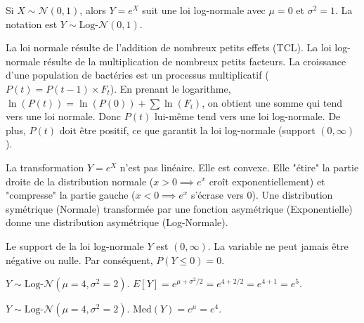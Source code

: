 \begin{correctionbox}
Si $X \sim \mathcal{N}(0, 1)$, alors $Y = e^X$ suit une loi log-normale avec $\mu=0$ et $\sigma^2=1$.
La notation est $Y \sim \text{Log-}\mathcal{N}(0, 1)$.
\end{correctionbox}

\begin{correctionbox}
La loi normale résulte de l'addition de nombreux petits effets (TCL).
La loi log-normale résulte de la multiplication de nombreux petits facteurs.
La croissance d'une population de bactéries est un processus multiplicatif ($P(t) = P(t-1) \times F_t$).
En prenant le logarithme, $\ln(P(t)) = \ln(P(0)) + \sum \ln(F_i)$, on obtient une somme qui tend vers une loi normale. Donc $P(t)$ lui-même tend vers une loi log-normale.
De plus, $P(t)$ doit être positif, ce que garantit la loi log-normale (support $(0, \infty)$).
\end{correctionbox}

\begin{correctionbox}
La transformation $Y = e^X$ n'est pas linéaire. Elle est convexe.
Elle "étire" la partie droite de la distribution normale ($x>0 \implies e^x$ croît exponentiellement) et "compresse" la partie gauche ($x<0 \implies e^x$ s'écrase vers 0).
Une distribution symétrique (Normale) transformée par une fonction asymétrique (Exponentielle) donne une distribution asymétrique (Log-Normale).
\end{correctionbox}

\begin{correctionbox}
Le support de la loi log-normale $Y$ est $(0, \infty)$. La variable ne peut jamais être négative ou nulle.
Par conséquent, $P(Y \le 0) = 0$.
\end{correctionbox}

\begin{correctionbox}
$Y \sim \text{Log-}\mathcal{N}(\mu=4, \sigma^2=2)$.
$E[Y] = e^{\mu + \sigma^2/2} = e^{4 + 2/2} = e^{4 + 1} = e^5$.
\end{correctionbox}

\begin{correctionbox}
$Y \sim \text{Log-}\mathcal{N}(\mu=4, \sigma^2=2)$.
$\text{Med}(Y) = e^{\mu} = e^4$.
\end{correctionbox}

